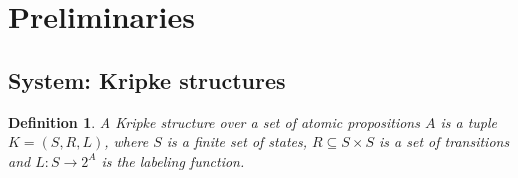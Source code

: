 \documentclass[11pt]{article}
\newtheorem{definition}{Definition}
\begin{document}



\section{Preliminaries}\label{sec:prelims}

\subsection{System: Kripke structures}

\begin{definition}
	A \emph{Kripke structure} over a set of atomic propositions $A$ is a tuple $K = (S, R, L)$, where $S$ is a finite set of states, $R \subseteq S\times S$ is a set of transitions and $L\colon S \to 2^A$ is the labeling function.
\end{definition}
\end{document}
